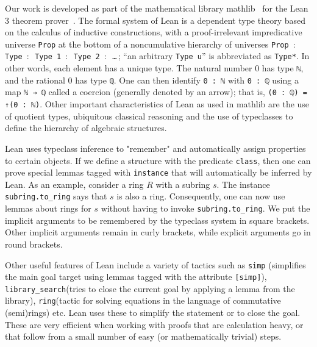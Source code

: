 \documentclass[sn-mathphys]{sn-jnl}%
\newcommand{\lean}[1]{\texttt{#1}\xspace}
\newcommand{\mathlib}{\textsf{mathlib}\xspace}
\begin{document}
Our work is developed as part of the mathematical library \mathlib~\cite{mathlib} for the Lean 3 theorem prover~\cite{lean-prover}.
The formal system of Lean is a dependent type theory based on the calculus of inductive constructions,
with a proof-irrelevant impredicative universe \lean{Prop} at the bottom of a noncumulative hierarchy of universes \lean{Prop $:$ Type $:$ Type 1 $:$ \mbox{Type 2} $:$ \dots}\,; ``an arbitrary \lean{Type u}'' is abbreviated as \lean{Type*}. 
In other words, each element has a unique type. The natural number 0 has type \lean{ℕ}, and the rational 0 has type \lean{ℚ}. One can then identify \lean{0 : ℕ} with \lean{0 : ℚ} using a map \lean{ℕ → ℚ} called a coercion (generally denoted by an arrow); 
that is, \lean{(0 : ℚ) = ↑(0 : ℕ)}. Other important characteristics of Lean as used in \mathlib are the use of quotient types, ubiquitous classical reasoning and the use of typeclasses to define the hierarchy of algebraic structures.

Lean uses typeclass inference to "remember" and automatically assign properties to certain objects. If we define a structure with the predicate \lean{class}, then one can prove special lemmas tagged with \lean{instance} that will automatically 
be inferred by Lean. As an example, consider a ring $R$ with a subring $s$. The instance \lean{subring.to\_ring} says that $s$ is also a ring. Consequently, one can now use lemmas about rings for $s$ without having to invoke \lean{subring.to\_ring}. We 
put the implicit arguments to be remembered by the typeclass system in square brackets. Other implicit arguments remain in curly brackets, while explicit arguments go in round brackets.

Other useful features of Lean include a variety of tactics such as \lean{simp} (simplifies the main goal target using lemmas tagged with the attribute \lean{[simp]}), \lean{library\_search}(tries to close the current goal by applying a lemma from the library), 
\lean{ring}(tactic for solving equations in the language of commutative (semi)rings) etc. Lean uses these to simplify the statement or to close the goal. These are very efficient when working with proofs that are calculation heavy, 
or that follow from a small number of easy (or mathematically trivial) steps.
\end{document}
